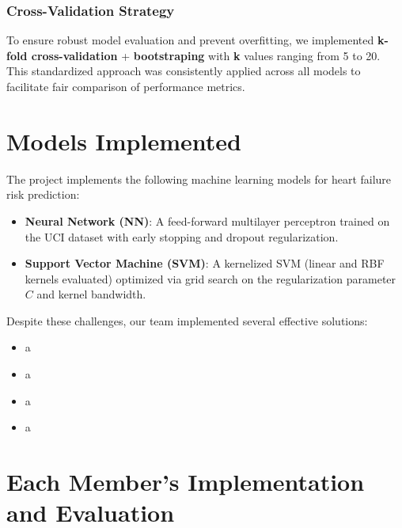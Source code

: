 \documentclass[11pt,a4paper]{article}
\begin{document}
\subsubsection{Cross-Validation Strategy}
\vspace{-0.25cm}
To ensure robust model evaluation and prevent overfitting,
we implemented \textbf{k-fold cross-validation} + \textbf{bootstraping} with \textbf{k} values ranging from 5 to 20.
This standardized approach was consistently applied across all models to facilitate
fair comparison of performance metrics.

\section{Models Implemented}
The project implements the following machine learning models for heart
failure risk prediction:
\begin{itemize}
    \vspace{-0.25cm}
    \item \textbf{Neural Network (NN)}: A feed-forward multilayer perceptron trained on the UCI dataset with early stopping and dropout regularization.
    \item \textbf{Support Vector Machine (SVM)}: A kernelized SVM (linear and RBF kernels evaluated) optimized via grid search on the regularization parameter $C$ and kernel bandwidth.
\end{itemize}


\begin{tcolorbox}[infobox={Insights and Solutions}]
    Despite these challenges, our team implemented several effective solutions:
    \vspace{-0.25cm}
    \begin{itemize}
        \item a
        \item a
        \item a
        \item a
    \end{itemize}
\end{tcolorbox}

\section{Each Member's Implementation and Evaluation}
\end{document}
